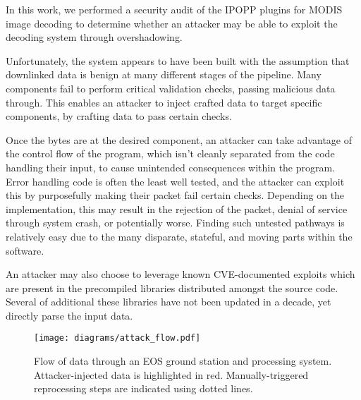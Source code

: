 In this work, we performed a security audit of the IPOPP plugins for MODIS image decoding to determine whether an attacker may be able to exploit the decoding system through overshadowing.

Unfortunately, the system appears to have been built with the assumption that downlinked data is benign at many different stages of the pipeline.
Many components fail to perform critical validation checks, passing malicious data through.
This enables an attacker to inject crafted data to target specific components, by crafting data to pass certain checks.

Once the bytes are at the desired component, an attacker can take advantage of the control flow of the program, which isn't cleanly separated from the code handling their input, to cause unintended consequences within the program.
Error handling code is often the least well tested, and the attacker can exploit this by purposefully making their packet fail certain checks.
Depending on the implementation, this may result in the rejection of the packet, denial of service through system crash, or potentially worse.
Finding such untested pathways is relatively easy due to the many disparate, stateful, and moving parts within the software.

An attacker may also choose to leverage known CVE-documented exploits which are present in the precompiled libraries distributed amongst the source code.
Several of additional these libraries have not been updated in a decade, yet directly parse the input data.




\begin{figure}
    \centering
    \texttt{[image: diagrams/attack\_flow.pdf]}
    \caption{Flow of data through an EOS ground station and processing system. Attacker-injected data is highlighted in red. Manually-triggered reprocessing steps are indicated using dotted lines.}
    \label{fig:attack_flow}
\end{figure}


